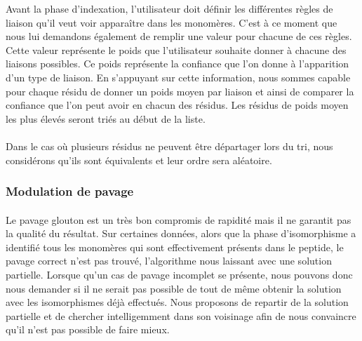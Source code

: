 \documentclass[12pt,french,twoside]{report}
\begin{document}
Avant la phase d'indexation, l'utilisateur doit définir les différentes
règles de liaison qu'il veut voir apparaître dans les monomères. C'est à ce moment que nous lui demandons également de remplir
une valeur pour chacune de ces règles. Cette valeur représente le poids que l'utilisateur souhaite donner à chacune des liaisons
possibles. Ce poids représente la confiance que l'on donne à l'apparition d'un type de liaison. En s'appuyant sur cette
information, nous
sommes capable pour chaque résidu de donner un poids moyen par liaison et ainsi de comparer la confiance que l'on peut
avoir en chacun des résidus. Les résidus de poids moyen les plus élevés seront triés au début de la liste.

\paragraph{}Dans le cas où plusieurs résidus ne peuvent être départager lors du tri, nous considérons qu'ils sont équivalents et
leur ordre sera aléatoire.


\subsubsection{Modulation de pavage}

\paragraph{}Le pavage glouton est un très bon compromis de rapidité mais il ne garantit pas la qualité du résultat.
Sur certaines données, alors que la phase d'isomorphisme a identifié tous les monomères qui sont effectivement présents dans le
peptide, le pavage correct n'est pas trouvé, l'algorithme nous laissant avec une solution partielle.
Lorsque qu'un cas de pavage incomplet se présente, nous pouvons donc nous demander si il ne serait pas possible de tout de même
obtenir la solution avec les isomorphismes déjà effectués.
Nous proposons de repartir de la solution partielle et de chercher intelligemment dans son voisinage afin de nous convaincre qu'il
n'est pas possible de faire mieux.
\end{document}
